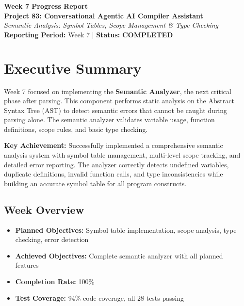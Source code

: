 \documentclass[a4paper,11pt]{article}
\newcommand{\statusgood}[1]{\colorbox{green!20}{\textbf{#1}}}
\begin{document}
    \begin{center}
        {\huge \textbf{Week 7 Progress Report}} \\
        \vspace{3mm}
        {\large \textbf{Project 83: Conversational Agentic AI Compiler Assistant}} \\
        \vspace{2mm}
        \textit{Semantic Analysis: Symbol Tables, Scope Management \& Type Checking} \\
        \vspace{2mm}
        \textbf{Reporting Period:} Week 7 | \textbf{Status:} \statusgood{COMPLETED}
    \end{center}

    \vspace{5mm}

    \section{Executive Summary}

    Week 7 focused on implementing the \textbf{Semantic Analyzer}, the next critical phase after parsing. This component performs static analysis on the Abstract Syntax Tree (AST) to detect semantic errors that cannot be caught during parsing alone. The semantic analyzer validates variable usage, function definitions, scope rules, and basic type checking.

    \textbf{Key Achievement:} Successfully implemented a comprehensive semantic analysis system with symbol table management, multi-level scope tracking, and detailed error reporting. The analyzer correctly detects undefined variables, duplicate definitions, invalid function calls, and type inconsistencies while building an accurate symbol table for all program constructs.

    \subsection{Week Overview}

    \begin{itemize}[leftmargin=*]
        \item \textbf{Planned Objectives:} Symbol table implementation, scope analysis, type checking, error detection
        \item \textbf{Achieved Objectives:} Complete semantic analyzer with all planned features
        \item \textbf{Completion Rate:} 100\%
        \item \textbf{Test Coverage:} 94\% code coverage, all 28 tests passing
    \end{itemize}
\end{document}
